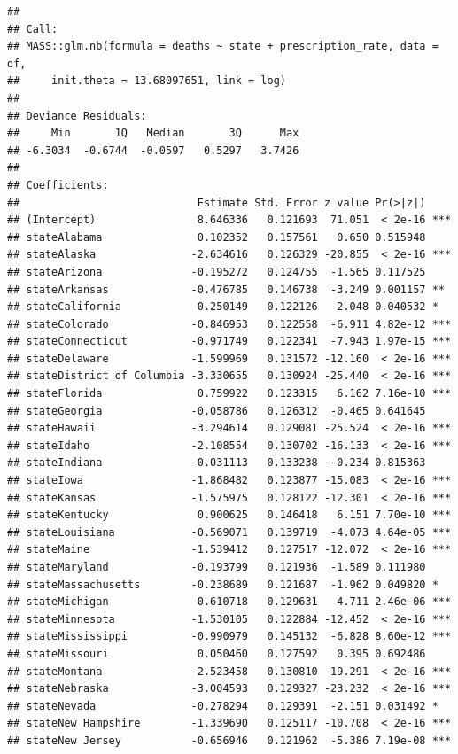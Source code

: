 \documentclass[]{article}
\begin{document}
\begin{verbatim}
## 
## Call:
## MASS::glm.nb(formula = deaths ~ state + prescription_rate, data = df, 
##     init.theta = 13.68097651, link = log)
## 
## Deviance Residuals: 
##     Min       1Q   Median       3Q      Max  
## -6.3034  -0.6744  -0.0597   0.5297   3.7426  
## 
## Coefficients:
##                            Estimate Std. Error z value Pr(>|z|)    
## (Intercept)                8.646336   0.121693  71.051  < 2e-16 ***
## stateAlabama               0.102352   0.157561   0.650 0.515948    
## stateAlaska               -2.634616   0.126329 -20.855  < 2e-16 ***
## stateArizona              -0.195272   0.124755  -1.565 0.117525    
## stateArkansas             -0.476785   0.146738  -3.249 0.001157 ** 
## stateCalifornia            0.250149   0.122126   2.048 0.040532 *  
## stateColorado             -0.846953   0.122558  -6.911 4.82e-12 ***
## stateConnecticut          -0.971749   0.122341  -7.943 1.97e-15 ***
## stateDelaware             -1.599969   0.131572 -12.160  < 2e-16 ***
## stateDistrict of Columbia -3.330655   0.130924 -25.440  < 2e-16 ***
## stateFlorida               0.759922   0.123315   6.162 7.16e-10 ***
## stateGeorgia              -0.058786   0.126312  -0.465 0.641645    
## stateHawaii               -3.294614   0.129081 -25.524  < 2e-16 ***
## stateIdaho                -2.108554   0.130702 -16.133  < 2e-16 ***
## stateIndiana              -0.031113   0.133238  -0.234 0.815363    
## stateIowa                 -1.868482   0.123877 -15.083  < 2e-16 ***
## stateKansas               -1.575975   0.128122 -12.301  < 2e-16 ***
## stateKentucky              0.900625   0.146418   6.151 7.70e-10 ***
## stateLouisiana            -0.569071   0.139719  -4.073 4.64e-05 ***
## stateMaine                -1.539412   0.127517 -12.072  < 2e-16 ***
## stateMaryland             -0.193799   0.121936  -1.589 0.111980    
## stateMassachusetts        -0.238689   0.121687  -1.962 0.049820 *  
## stateMichigan              0.610718   0.129631   4.711 2.46e-06 ***
## stateMinnesota            -1.530105   0.122884 -12.452  < 2e-16 ***
## stateMississippi          -0.990979   0.145132  -6.828 8.60e-12 ***
## stateMissouri              0.050460   0.127592   0.395 0.692486    
## stateMontana              -2.523458   0.130810 -19.291  < 2e-16 ***
## stateNebraska             -3.004593   0.129327 -23.232  < 2e-16 ***
## stateNevada               -0.278294   0.129391  -2.151 0.031492 *  
## stateNew Hampshire        -1.339690   0.125117 -10.708  < 2e-16 ***
## stateNew Jersey           -0.656946   0.121962  -5.386 7.19e-08 ***

\end{verbatim}
\end{document}
